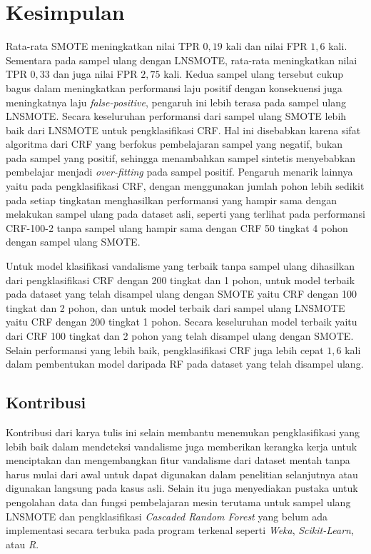 \chapter{Kesimpulan}

Rata-rata SMOTE meningkatkan nilai TPR $0,19$ kali dan nilai FPR $1,6$ kali.
Sementara pada sampel ulang dengan LNSMOTE, rata-rata meningkatkan nilai TPR
$0,33$ dan juga nilai FPR $2,75$ kali.
Kedua sampel ulang tersebut cukup bagus dalam meningkatkan performansi laju
positif dengan konsekuensi juga meningkatnya laju \textit{false-positive},
pengaruh ini lebih terasa pada sampel ulang LNSMOTE.
Secara keseluruhan performansi dari sampel ulang SMOTE lebih baik dari
LNSMOTE untuk pengklasifikasi CRF.
Hal ini disebabkan karena sifat algoritma dari CRF yang berfokus pembelajaran
sampel yang negatif, bukan pada sampel yang positif, sehingga menambahkan
sampel sintetis menyebabkan pembelajar menjadi \textit{over-fitting} pada
sampel positif.
Pengaruh menarik lainnya yaitu pada pengklasifikasi CRF, dengan menggunakan
jumlah pohon lebih sedikit pada setiap tingkatan menghasilkan performansi yang
hampir sama dengan melakukan sampel ulang pada dataset asli, seperti yang
terlihat pada performansi CRF-100-2 tanpa sampel ulang hampir sama dengan CRF
50 tingkat 4 pohon dengan sampel ulang SMOTE.

Untuk model klasifikasi vandalisme yang terbaik tanpa sampel ulang dihasilkan
dari pengklasifikasi CRF dengan 200 tingkat dan 1 pohon, untuk model terbaik
pada dataset yang telah disampel ulang dengan SMOTE yaitu CRF dengan 100
tingkat dan 2 pohon, dan untuk model terbaik dari sampel ulang LNSMOTE yaitu
CRF dengan 200 tingkat 1 pohon. Secara keseluruhan model terbaik yaitu dari CRF
100 tingkat dan 2 pohon yang telah disampel ulang dengan SMOTE.
Selain performansi yang lebih baik, pengklasifikasi CRF juga lebih cepat $1,6$
kali dalam pembentukan model daripada RF pada dataset yang telah disampel
ulang.

\section{Kontribusi}

Kontribusi dari karya tulis ini selain membantu menemukan pengklasifikasi yang
lebih baik dalam mendeteksi vandalisme juga memberikan kerangka kerja untuk
menciptakan dan mengembangkan fitur vandalisme dari dataset mentah tanpa harus
mulai dari awal untuk dapat digunakan dalam penelitian selanjutnya atau
digunakan langsung pada kasus asli. Selain itu juga menyediakan pustaka untuk
pengolahan data dan fungsi pembelajaran mesin terutama untuk sampel ulang
LNSMOTE dan pengklasifikasi
\textit{Cascaded Random Forest} yang belum ada implementasi secara terbuka pada
program terkenal seperti \textit{Weka}, \textit{Scikit-Learn}, atau \textit{R}.

